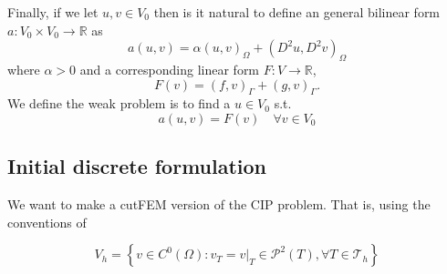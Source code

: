     Finally, if we let $u,v \in V_{0}$ then is it natural to define an general bilinear form $ a: V_{0} \times  V_{0} \to   \mathbb{R} $ as \[
    a( u,v) = \alpha ( u,v)_{\Omega } + ( D^2u, D^2v)_{\Omega }
    \]
    where $\alpha >0$ and a corresponding linear form $F: V \to \mathbb{R} $,
    \[
    F( v) = ( f ,v)_{\Gamma } +  ( g,v)_{\Gamma } .
    \]
    We define the weak problem is to find a $u \in  V_{0}$ s.t. \[
    a( u,v) = F(v) \quad  \forall v \in V_{0}
    \]

\subsection{Initial discrete formulation}%
\label{sub:initial_discrete_formulation}

We want to make a cutFEM version of the CIP problem. That is, using the conventions of

\[
V_{h} = \left\{ v \in C^{0}\left( \Omega  \right): v_{T} = v | _{T} \in \mathcal{P} ^{2}\left( T \right), \forall T \in
\mathcal{T}_{h}    \right\}
\]



